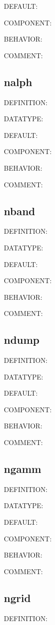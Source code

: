 {\color{blue}DEFAULT:}

{\color{brown}COMPONENT:}

{\color{purple}BEHAVIOR:}

{\color{olive}COMMENT:}

\subsection{nalph}
{\color{red}DEFINITION:}

{\color{green}DATATYPE:}

{\color{blue}DEFAULT:}

{\color{brown}COMPONENT:}

{\color{purple}BEHAVIOR:}

{\color{olive}COMMENT:}

\subsection{nband}
{\color{red}DEFINITION:}

{\color{green}DATATYPE:}

{\color{blue}DEFAULT:}

{\color{brown}COMPONENT:}

{\color{purple}BEHAVIOR:}

{\color{olive}COMMENT:}

\subsection{ndump}
{\color{red}DEFINITION:}

{\color{green}DATATYPE:}

{\color{blue}DEFAULT:}

{\color{brown}COMPONENT:}

{\color{purple}BEHAVIOR:}

{\color{olive}COMMENT:}

\subsection{ngamm}
{\color{red}DEFINITION:}

{\color{green}DATATYPE:}

{\color{blue}DEFAULT:}

{\color{brown}COMPONENT:}

{\color{purple}BEHAVIOR:}

{\color{olive}COMMENT:}

\subsection{ngrid}
{\color{red}DEFINITION:}

